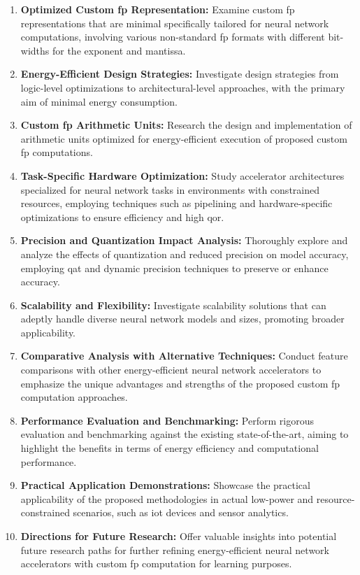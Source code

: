 \begin{enumerate}[label={\textbf{O\arabic*}}]
	\item \textbf{Optimized Custom \gls{fp} Representation:} 
	Examine custom \gls{fp} representations that are minimal specifically tailored for neural network computations, involving various non-standard \gls{fp} formats with different bit-widths for the exponent and mantissa.
	
	\item \textbf{Energy-Efficient Design Strategies:} 
	Investigate design strategies from logic-level optimizations to architectural-level approaches, with the primary aim of minimal energy consumption.
	
	\item \textbf{Custom \gls{fp} Arithmetic Units:} 
	Research the design and implementation of arithmetic units optimized for energy-efficient execution of proposed custom \gls{fp} computations.
	
	\item \textbf{Task-Specific Hardware Optimization:} 
	Study accelerator architectures specialized for neural network tasks in environments with constrained resources, employing techniques such as pipelining and hardware-specific optimizations to ensure efficiency and high \gls{qor}.
	
	\item \textbf{Precision and Quantization Impact Analysis:} 
	Thoroughly explore and analyze the effects of quantization and reduced precision on model accuracy, employing \gls{qat} and dynamic precision techniques to preserve or enhance accuracy.
	
	\item \textbf{Scalability and Flexibility:} 
	Investigate scalability solutions that can adeptly handle diverse neural network models and sizes, promoting broader applicability.
	
	\item \textbf{Comparative Analysis with Alternative Techniques:} 
	Conduct feature comparisons with other energy-efficient neural network accelerators to emphasize the unique advantages and strengths of the proposed custom \gls{fp} computation approaches.
	
	\item \textbf{Performance Evaluation and Benchmarking:} 
	Perform rigorous evaluation and benchmarking against the existing state-of-the-art, aiming to highlight the benefits in terms of energy efficiency and computational performance.
	
	\item \textbf{Practical Application Demonstrations:} 
	Showcase the practical applicability of the proposed methodologies in actual low-power and resource-constrained scenarios, such as \gls{iot} devices and sensor analytics.
	
	\item \textbf{Directions for Future Research:} 
	Offer valuable insights into potential future research paths for further refining energy-efficient neural network accelerators with custom \gls{fp} computation for learning purposes.
\end{enumerate}



